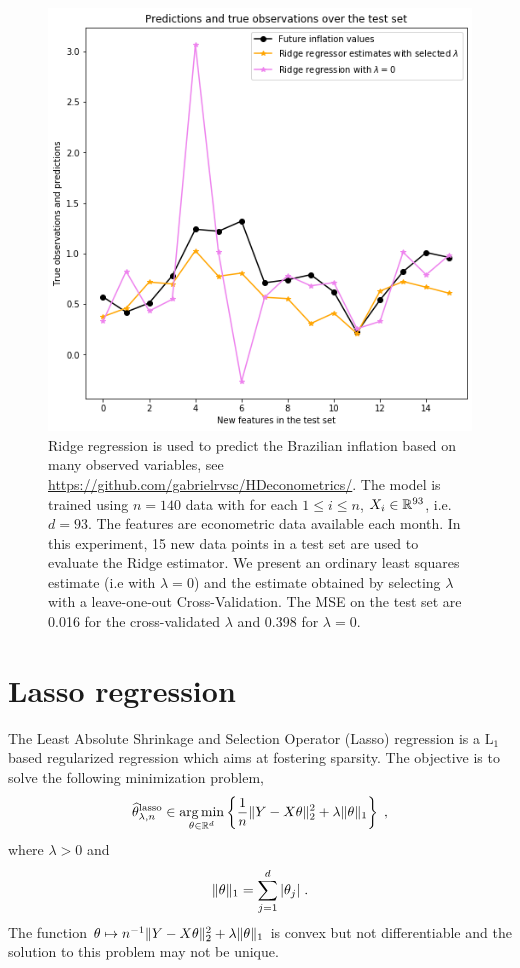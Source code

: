 \begin{figure}
\begin{center}
\includegraphics[width = .7\linewidth]{./Illustrations/ridge_pred_inflation.png}
\end{center}
\caption{Ridge regression is used to predict the Brazilian inflation based on many observed variables, see \url{https://github.com/gabrielrvsc/HDeconometrics/}. The model is trained using $n=140$ data with for each $1\leqslant i \leqslant n$, $X_i\in\mathbb{R}^{93}$, i.e. $d  =93$. The features are econometric data available each month. In this experiment, 15 new data points in a test set are used to evaluate the Ridge estimator. We present an ordinary least squares estimate (i.e with $\lambda = 0$) and the estimate obtained by selecting $\lambda$ with a leave-one-out Cross-Validation. The MSE on the test set are 0.016 for the cross-validated $\lambda$ and 0.398 for $\lambda = 0$.}
\end{figure}



\section{Lasso regression}
The Least Absolute Shrinkage and Selection Operator (Lasso) regression is a $\mathrm{L}_1$ based regularized regression which aims at fostering sparsity. The objective is to solve the following minimization problem,
\begin{equation}
\label{eq:lasso:obj}
\widehat \param^{\mathrm{lasso}}_{\lambda,n}\in  \argmin_{\param\in\rset^d}  \left\{\frac{1}{n}\|Y - X\param\|_2^2 + \lambda\|\param\|_1\right\}\eqsp,
\end{equation}
where $\lambda>0$ and
\[
\|\theta\|_1 = \sum_{j=1}^d|\theta_j|\;.
\]
The function $\theta \mapsto n^{-1}\|Y - X\theta\|_2^2 + \lambda\|\theta\|_1$ is convex but not differentiable and the solution to this problem may  not be unique. 


